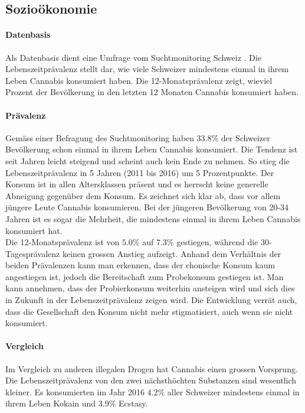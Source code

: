 \documentclass[../main.tex]{subfiles}
\begin{document}
	
	\subsection{Sozioökonomie}
	
	\paragraph{Datenbasis}
	Als Datenbasis dient eine Umfrage vom Suchtmonitoring Schweiz \cite{gmel}.
	Die Lebenszeitprävalenz stellt dar, wie viele Schweizer mindestens einmal in ihrem Leben Cannabis konsumiert haben.
	Die 12-Monatsprävalenz zeigt, wieviel Prozent der Bevölkerung in den letzten 12 Monaten Cannabis konsumiert haben.
	
	
	\paragraph{Prävalenz}	
	Gemäss einer Befragung des Suchtmonitoring haben $33.8\%$ der Schweizer Bevölkerung schon einmal in ihrem Leben Cannabis konsumiert.
	Die Tendenz ist seit Jahren leicht steigend und scheint auch kein Ende zu nehmen. 
	So stieg die Lebenszeitprävalenz in 5 Jahren (2011 bis 2016) um 5 Prozentpunkte. 
	Der Konsum ist in allen Altersklassen präsent und es herrscht keine generelle Abneigung gegenüber dem Konsum. 
	Es zeichnet sich klar ab, dass vor allem jüngere Leute Cannabis konsumieren. 
	Bei der jüngeren Bevölkerung von 20-34 Jahren ist es sogar die Mehrheit, die mindestens einmal in ihrem Leben Cannabis konsumiert hat.\\
	
	\noindent
	Die 12-Monatsprävalenz ist von $5.0\%$ auf $7.3\%$ gestiegen, während die 30-Tagesprävalenz keinen grossen Anstieg aufzeigt. 
	Anhand dem Verhältnis der beiden Prävalenzen kann man erkennen, dass der chonische Konsum kaum angestiegen ist, jedoch die Bereitschaft zum Probekonsum gestiegen ist. 
	Man kann annehmen, dass der Probierkonsum weiterhin ansteigen wird und sich dies in Zukunft in der Lebenszeitprävalenz zeigen wird.
	Die Entwicklung verrät auch, dass die Gesellschaft den Konsum nicht mehr stigmatisiert, auch wenn sie nicht konsumiert.
	
	\paragraph{Vergleich}
	Im Vergleich zu anderen illegalen Drogen hat Cannabis einen grossen Vorsprung.
	Die Lebenszeitprävalenz von den zwei nächsthöchten Substanzen sind wesentlich kleiner.
	Es konsumierten im Jahr 2016 4.2\% aller Schweizer mindestens einmal in ihrem Leben Kokain und 3.9\% Ecstasy.
	
\end{document}
